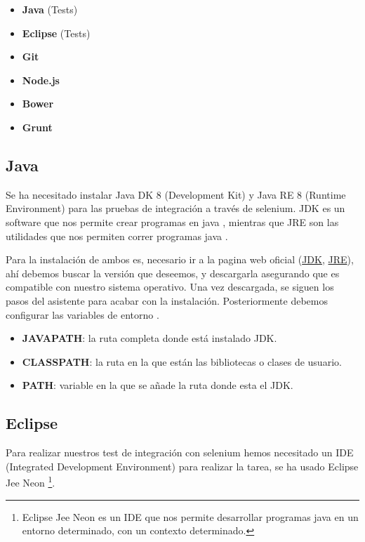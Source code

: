 \begin{itemize}
	\item \textbf{Java} (Tests)
	\item \textbf{Eclipse} (Tests)
	\item \textbf{Git}
	\item \textbf{Node.js}
	\item \textbf{Bower}
	\item \textbf{Grunt}
\end{itemize}

\subsection{Java}

Se ha necesitado instalar Java DK 8 (Development Kit) y Java RE 8 (Runtime Environment) para las pruebas de integración a través de selenium. JDK es un software que nos permite crear programas en java \cite{jdkbib}, mientras que JRE son las utilidades que nos permiten correr programas java \cite{jrebib}.

Para la instalación de ambos es, necesario ir a la pagina web oficial (\href{http://www.oracle.com/technetwork/java/javase/downloads/jdk8-downloads-2133151.html}{JDK}, \href{http://www.oracle.com/technetwork/java/javase/downloads/jre8-downloads-2133155.html}{JRE}), ahí debemos buscar la versión que deseemos, y descargarla asegurando que es compatible con nuestro sistema operativo. Una vez descargada, se siguen los pasos del asistente para acabar con la instalación. Posteriormente debemos configurar las variables de entorno \cite{jdkbib}.

\begin{itemize}
	\item \textbf{JAVAPATH}: la ruta completa donde está instalado JDK.
	\item \textbf{CLASSPATH}: la ruta en la que están las bibliotecas o clases de usuario.
	\item \textbf{PATH}: variable en la que se añade la ruta donde esta el JDK.
\end{itemize}


\subsection{Eclipse}
 Para realizar nuestros test de integración con selenium hemos necesitado un IDE (Integrated Development Environment) para realizar la tarea, se ha usado Eclipse Jee Neon \footnote{Eclipse Jee Neon es un IDE que nos permite desarrollar programas java en un entorno determinado, con un contexto determinado.}.
 
